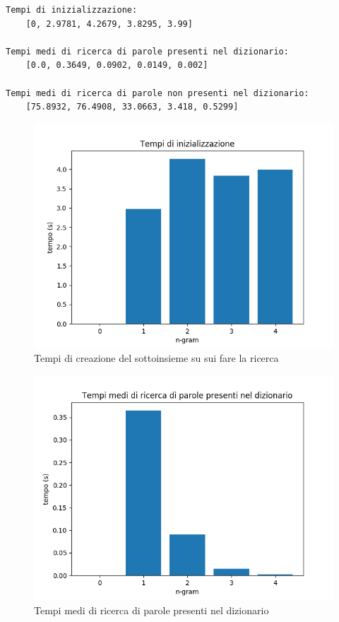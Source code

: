 \documentclass[]{article}
\begin{document}
\begin{verbatim}
Tempi di inizializzazione:
    [0, 2.9781, 4.2679, 3.8295, 3.99]
    
Tempi medi di ricerca di parole presenti nel dizionario:
    [0.0, 0.3649, 0.0902, 0.0149, 0.002]
    
Tempi medi di ricerca di parole non presenti nel dizionario:
    [75.8932, 76.4908, 33.0663, 3.418, 0.5299]
\end{verbatim}

\begin{figure}[H]
	\includegraphics{tempi_inizializzazione.png}
	\caption{Tempi di creazione del sottoinsieme su sui fare la ricerca}
	\label{tempiInizializzazione}
\end{figure}

\begin{figure}[H]
	\includegraphics{tempi_ricerca_parole_presenti}
	\caption{Tempi medi di ricerca di parole presenti nel dizionario}
	\label{tempiParolePresenti}
\end{figure}
\end{document}
